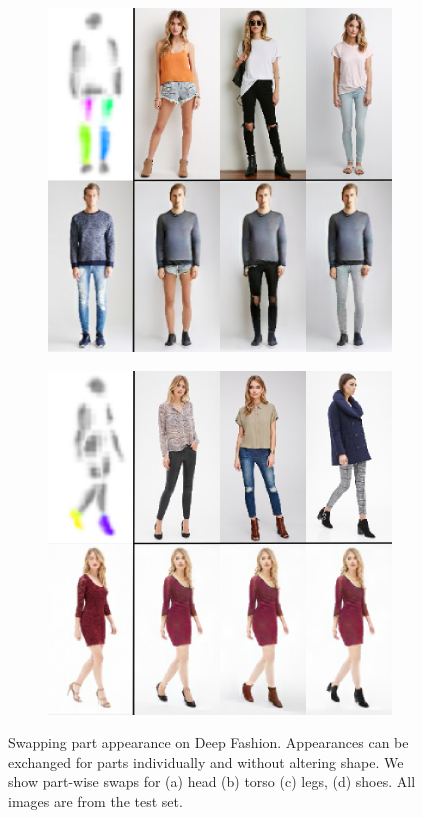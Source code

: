 \begin{figure}[t]
\begin{subfigure}{0.49\linewidth}
	\label{fig:part3_11}
	\end{subfigure}
	\begin{subfigure}{0.49\linewidth}
	\centering
	\includegraphics[trim={0cm 0cm 0cm 0cm},clip, width=1.\linewidth]{fig/part_legs}\caption{}
	\label{fig:part3_21}
	\end{subfigure}
	\begin{subfigure}{0.49\linewidth}
	\centering
	\includegraphics[trim={0cm 0cm 0cm 0cm},clip, width=1.\linewidth]{fig/part_shoe}\caption{}
	\label{fig:part3_30}
	\end{subfigure}
	\caption{Swapping part appearance on Deep Fashion. Appearances can be exchanged for parts individually and without altering shape. We show part-wise swaps for (a) head (b) torso (c) legs, (d) shoes. All images are from the test set.}
	\label{fig:partswaps}
\end{figure}

